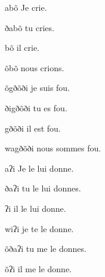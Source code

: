 \documentclass{article}
\begin{document}
\begin{multicols}{2}
\begin{exe}
\ex \label{ex:aboN}
\glt abõ 
\glt Je crie.
\end{exe} 

\begin{exe}
\ex 
\glt ðabõ 
\glt tu cries.
\end{exe} 
 
 \begin{exe}
\ex 
\glt bõ 
\glt il crie.
\end{exe} 
 
  \begin{exe}
\ex 
\glt õbõ 
\glt nous crions.
\end{exe} 

  \begin{exe}
\ex 
\glt õgðõði
\glt je suis fou.
\end{exe} 

  \begin{exe}
\ex 
\glt ðigðõði
\glt tu es fou.
\end{exe} 

  \begin{exe}
\ex 
\glt gðõði
\glt il est fou.
\end{exe} 

  \begin{exe}
\ex 
\glt wagðõði
\glt nous sommes fou.
\end{exe} 

\begin{exe}
\ex 
\glt aʔi
\glt Je le lui donne.
\end{exe} 

\begin{exe}
\ex 
\glt ðaʔi
\glt tu le lui donnes.
\end{exe} 
 
 \begin{exe}
\ex 
\glt ʔi
\glt il le lui donne.
\end{exe} 

 \begin{exe}
\ex 
\glt wiʔi
\glt je te le donne.
\end{exe} 

 \begin{exe}
\ex 
\glt õðaʔi
\glt tu me le donnes.
\end{exe} 

 \begin{exe}
\ex 
\glt õʔi
\glt il me le donne.
\end{exe} 


\end{multicols}
\end{document}
